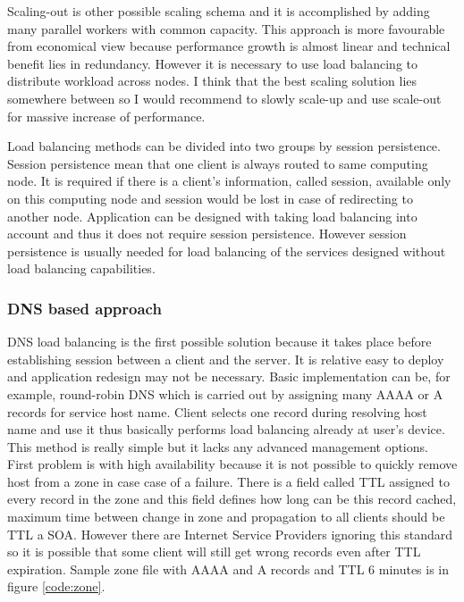Scaling-out is other possible scaling schema and it is accomplished by adding many parallel workers with common capacity. This approach is more favourable from economical view because performance growth is almost linear and technical benefit lies in redundancy. However it is necessary to use load balancing to distribute workload across nodes. I think that the best scaling solution lies somewhere between so I would recommend to slowly scale-up and use scale-out for massive increase of performance.

Load balancing methods can be divided into two groups by session persistence. Session persistence mean that one client is always routed to same computing node. It is required if there is a client's information, called session, available only on this computing node and session would be lost in case of redirecting to another node. Application can be designed with taking load balancing into account and thus it does not require session persistence. However session persistence is usually needed for load balancing of the services designed without load balancing capabilities.

\subsubsection{DNS based approach}
\Ac{DNS} load balancing is the first possible solution because it takes place before establishing session between a client and the server. It is relative easy to deploy and application redesign may not be necessary. Basic implementation can be, for example, round-robin \Ac{DNS} which is carried out by assigning many AAAA or A records for service host name. Client selects one record during resolving host name and use it thus basically performs load balancing already at user's device. This method is really simple but it lacks any advanced management options. First problem is with high availability because it is not possible to quickly remove host from a zone in case case of a failure. There is a field called \Ac{TTL} assigned to every record in the zone and this field defines how long can be this record cached, maximum time between change in zone and propagation to all clients should be \Ac{TTL} a \Ac{SOA}. However there are Internet Service Providers ignoring this standard so it is possible that some client will still get wrong records even after \Ac{TTL} expiration. Sample zone file with AAAA and A records and \Ac{TTL} 6 minutes is in figure \ref{code:zone}.

